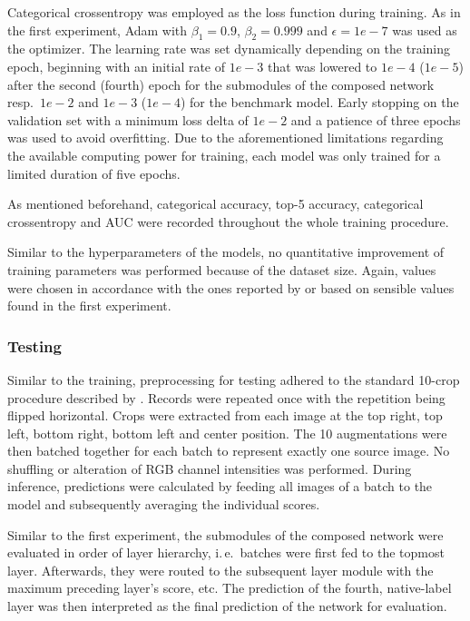 Categorical crossentropy was employed as the loss function during training. As in the first experiment, Adam with $\beta_1 = 0.9$, $\beta_2 = 0.999$ and $\epsilon = 1e-7$ was used as the optimizer. The learning rate was set dynamically depending on the training epoch, beginning with an initial rate of $1e-3$ that was lowered to $1e-4$ ($1e-5$) after the second (fourth) epoch for the submodules of the composed network resp.~$1e-2$ and $1e-3$ ($1e-4$) for the benchmark model. Early stopping on the validation set with a minimum loss delta of $1e-2$ and a patience of three epochs was used to avoid overfitting. Due to the aforementioned limitations regarding the available computing power for training, each model was only trained for a limited duration of five epochs.

As mentioned beforehand, categorical accuracy, top-5 accuracy, categorical crossentropy and AUC were recorded throughout the whole training procedure.

Similar to the hyperparameters of the models, no quantitative improvement of training parameters was performed because of the dataset size. Again, values were chosen in accordance with the ones reported by \cite{Simonyan2014-bt} or based on sensible values found in the first experiment.
               
\subsubsection{Testing%
               \label{sec:experiments_imagenet_testing}}
               
Similar to the training, preprocessing for testing adhered to the standard 10-crop procedure described by \cite{Krizhevsky2012-jr}. Records were repeated once with the repetition being flipped horizontal. Crops were extracted from each image at the top right, top left, bottom right, bottom left and center position. The 10 augmentations were then batched together for each batch to represent exactly one source image. No shuffling or alteration of RGB channel intensities was performed. During inference, predictions were calculated by feeding all images of a batch to the model and subsequently averaging the individual scores.

Similar to the first experiment, the submodules of the composed network were evaluated in order of layer hierarchy, i.\,e.\ batches were first fed to the topmost layer. Afterwards, they were routed to the subsequent layer module with the maximum preceding layer's score, etc. The prediction of the fourth, native-label layer was then interpreted as the final prediction of the network for evaluation.

